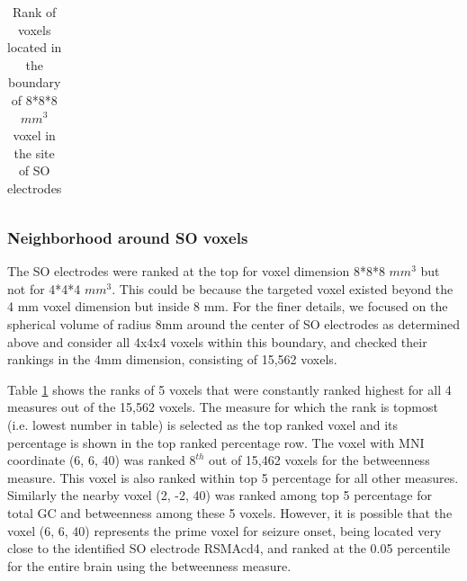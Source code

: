 \begin{table}[]
\begin{tabular}{|l|r|r|r|r|r|}
\end{tabular}
	\caption{Rank of voxels located in the boundary of  8*8*8 $mm^3$ voxel in the site of SO electrodes}
	\label{table:rank_of_voxels_nearby_soe}
\end{table}


\subsubsection{Neighborhood around SO voxels}
The SO electrodes were ranked at the top for voxel dimension 8*8*8 $mm^3$ but not for 4*4*4 $mm^3$. This could be because the targeted voxel existed beyond the 4 mm voxel dimension but inside 8 mm. For the finer details, we focused on the spherical volume of radius 8mm around the center of SO electrodes as determined above and consider all 4x4x4 voxels within this boundary, and checked their rankings in the 4mm dimension, consisting of 15,562 voxels.

Table \ref{table:rank_of_voxels_nearby_soe} shows the ranks of 5 voxels that were constantly ranked highest for all 4 measures out of the 15,562 voxels. The measure for which the rank is topmost (i.e. lowest number in table) is selected as the top ranked voxel and its percentage is shown in the top ranked percentage row. The voxel with MNI coordinate (6, 6, 40) was ranked $8^{th}$ out of 15,462 voxels for the betweenness measure. This voxel is also ranked within top 5 percentage for all other measures. Similarly the nearby voxel (2, -2, 40) was ranked among top 5 percentage for total GC and betweenness among these 5 voxels. However, it is possible that the voxel (6, 6, 40) represents the prime voxel for seizure onset, being located very close to the identified SO electrode RSMAcd4, and ranked at the 0.05 percentile for the entire brain using the betweenness measure. 


